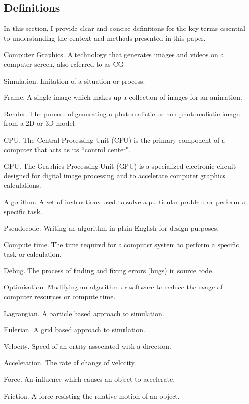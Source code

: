 \documentclass[write-up.tex]{subfiles}
\begin{document}
\subsection{Definitions}
In this section, I provide clear and concise definitions for the key terms essential to understanding the context and methods presented in this paper.
\begin{worddefs}
 \item [Computer Graphics.] A technology that generates images and videos on a computer screen, also referred to as CG.
 \item [Simulation.] Imitation of a situation or process.
 \item [Frame.] A single image which makes up a collection of images for an animation.
 \item[Render.] The process of generating a photorealistic or non-photorealistic image from a 2D or 3D model.
 \item[CPU.] The Central Processing Unit (CPU) is the primary component of a computer that acts as its “control center".
 \item[GPU.] The Graphics Processing Unit (GPU) is a specialized electronic circuit  designed for digital image processing and to accelerate computer graphics calculations.
 \item [Algorithm.] A set of instructions used to solve a particular problem or perform a specific task.
 \item [Pseudocode.] Writing an algorithm in plain English for design purposes.
 \item[Compute time.] The time required for a computer system to perform a specific task or calculation.
 \item [Debug.] The process of finding and fixing errors (bugs) in source code.
 \item [Optimisation.] Modifying an algorithm or software to reduce the usage of computer resources or compute time.
 \item [Lagrangian.] A particle based approach to simulation.
 \item[Eulerian.] A grid based approach to simulation.
 \item[Velocity.] Speed of an entity associated with a direction.
 \item[Acceleration.] The rate of change of velocity.
 \item[Force.] An influence which causes an object to accelerate.
 \item[Friction.] A force resisting the relative motion of an object.

\end{worddefs}
\end{document}
